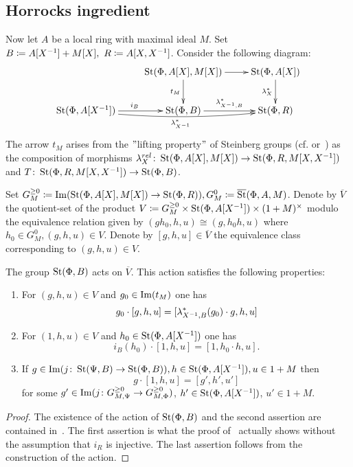 \subsection{Horrocks ingredient}\label{subsec:horrocks-ingredient}


Now let $A$ be a local ring with maximal ideal $M$.
Set $B \coloneqq A[X^{-1}] + M[X],\ R \coloneqq A[X, X^{-1}]$.
Consider the following diagram:
\[ \xymatrix{ & \St(\Phi, A[X], M[X]) \ar[d]_{t_M} \ar[r] & \St(\Phi, A[X]) \ar[d]_{\lambda_X^*} \\
\St(\Phi, A[X\inv]) \ar[r]^{i_B} \ar@/_/[rr]_{\lambda_{X\inv}^*} & \St(\Phi, B) \ar[r]^{\lambda^*_{X\inv, B}} & \St(\Phi, R)
}\]
The arrow $t_M$ arises from the \("\)lifting property\("\) of Steinberg groups (cf. \cite[Lemma~3.3]{LS20} or~\cite[Theorem~3]{LS17}) as the composition of morphisms
$\lambda_{X}^{rel}\colon \operatorname{St}(\Phi, A[X], M[X]) \to \operatorname{St}(\Phi, R, M[X, X^{-1}])$ and $T \colon \operatorname{St}(\Phi, R, M[X, X^{-1}]) \to \operatorname{St}(\Phi, B)$.

Set $G_M^{\geq 0} \coloneqq \operatorname{Im}(\operatorname{St}(\Phi, A[X], M[X]) \to \operatorname{St}(\Phi, R)), G_M^0 \coloneqq \overline{\operatorname{St}}(\Phi, A, M)$.%
Denote by $\overline{V}$ the quotient-set of the product $V \coloneqq G_M^{\geq 0} \times \operatorname{St}(\Phi, A[X^{-1}]) \times (1 + M)^\times$
modulo the equivalence relation given by $(gh_0, h, u) \cong (g, h_0h, u)$ where $h_0 \in G_M^0, (g, h, u) \in V.$
Denote by $[g, h, u] \in \overline{V}$ the equivalence class corresponding to $(g, h, u)\in V$.

\begin{prop} \label{prop:horrocks-main} The group $\operatorname{St}(\Phi, B)$ acts on $\overline{V}$.
This action satisfies the following properties:
\begin{enumerate}
    \item For $(g, h, u) \in V$ and $g_0 \in \operatorname{Im}(t_M)$ one has
    \[g_0 \cdot [g, h, u] = [\lambda_{X^{-1}, B}^* (g_0) \cdot g, h, u]\]
    \item For $(1, h, u) \in V$ and $h_0 \in \operatorname{St}(\Phi, A[X^{-1}])$ one has
    \[ i_B(h_0) \cdot [1, h, u] = [1, h_0 \cdot h, u].\]
    \item If $g \in \operatorname{Im}(j\colon \operatorname{St}(\Psi, B) \to \operatorname{St}(\Phi, B)), h \in \operatorname{St}(\Phi, A[X^{-1}]), u \in 1 + M$ then
    \[ g \cdot [1, h, u] = [g', h', u']\] for some $g' \in \operatorname{Im}(j\colon G_{M, \Psi}^{\geq 0} \to G_{M, \Phi}^{\geq 0})$, $h' \in \operatorname{St}(\Phi, A[X^{-1}])$, $u'\in 1 + M$.
\end{enumerate}
\end{prop}
\begin{proof}
    The existence of the action of $\operatorname{St}(\Phi, B)$ and the second assertion are contained in~\cite[Proposition~5.39]{LS20}.
    The first assertion is what the proof of~\cite[Lemma~5.41]{LS20} actually shows without the assumption that $i_R$ is injective.
    The last assertion follows from the construction of the action. %
\end{proof}


